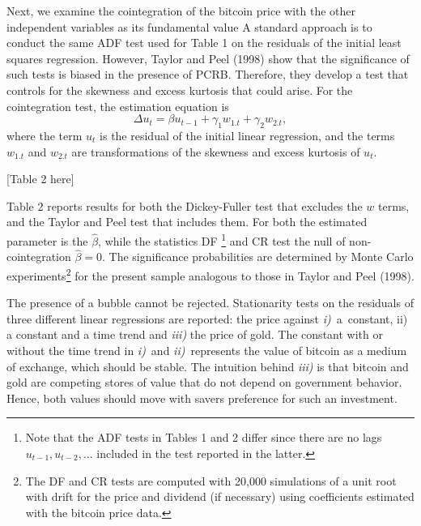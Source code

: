 \documentclass{article}
\begin{document}
Next, we examine the cointegration of the bitcoin price with the other
independent variables as its fundamental value A standard approach is to
conduct the same ADF test used for Table 1 on the residuals of the initial
least squares regression. However, Taylor and Peel (1998) show that the
significance of such tests is biased in the presence of PCRB. Therefore,
they develop a test that controls for the skewness and excess kurtosis that
could arise. For the cointegration test, the estimation equation is
\begin{equation*}
\Delta u_{t}=\beta u_{t-1}+\gamma _{1}w_{1.t}+\gamma _{2}w_{2.t},
\end{equation*}%
where the term $u_{t}$ is the residual of the initial linear regression,
and the terms $w_{1.t}$ and $w_{2.t}$ are transformations of the skewness
and excess kurtosis of $u_{t}$. \medskip

\begin{center}
[Table 2 here]
\end{center}

\bigskip

Table 2 reports results for both the Dickey-Fuller test that excludes the $w$
terms, and the Taylor and Peel test that includes them. For both the
estimated parameter is the $\widehat{\beta }$, while the statistics DF%
\footnote{%
Note that the ADF tests in Tables 1 and 2 differ since there are no lags $%
u_{t-1},u_{t-2},...$ included in the test reported in the latter.} and CR
test the null of non-cointegration $\widehat{\beta }=0$. The significance
probabilities are determined by Monte Carlo experiments\footnote{%
The DF and CR tests are computed with 20,000 simulations of a unit root with
drift for the price and dividend (if necessary) using coefficients estimated
with the bitcoin price data.} for the present sample analogous to those in
Taylor and Peel (1998).

The presence of a bubble cannot be rejected. Stationarity tests on the
residuals of three different linear regressions are reported: the price
against \textit{i)}\ a\ constant, ii) a constant and a time trend and
\textit{iii)} the price of gold. The constant with or without the time
trend in \textit{i)}\ and \textit{ii)}\ represents the value of bitcoin as a
medium of exchange, which should be stable. The intuition behind \textit{%
iii)} is that bitcoin and gold are competing stores of value that do not
depend on government behavior. Hence, both values should move with savers
preference for such an investment.
\end{document}
